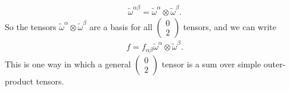 \documentclass[11pt,letterpaper]{book}
\begin{document}
    \begin{align}
    \tilde{\omega}^{\alpha\beta} = \tilde{\omega}^\alpha \otimes \tilde{\omega}^\beta. \tag{3.25}
    \end{align}
    So the tensors \(\tilde{\omega}^\alpha \otimes \tilde{\omega}^\beta\) are a basis for all \(\left(\begin{array}{c} 0 \\ 2 \end{array}\right)\) tensors, and we can write
    \begin{align}
    f = f_{\alpha\beta} \tilde{\omega}^\alpha \otimes \tilde{\omega}^\beta. \tag{3.26}
    \end{align}
    This is one way in which a general \(\left(\begin{array}{c} 0 \\ 2 \end{array}\right)\) tensor is a sum over simple outer-product tensors.
    
\end{document}

